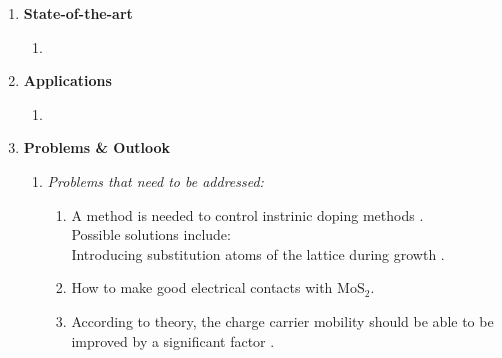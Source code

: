 \documentclass{article}
\begin{document}
\begin{enumerate}
	\item{\textbf{State-of-the-art}}
		\begin{enumerate} %
			\item{}
		\end{enumerate}	%

	\item{\textbf{Applications}}
		\begin{enumerate}
			\item{}
		\end{enumerate}

	\item{\textbf{Problems \& Outlook}}

		\begin{enumerate}	%
			\item{\textit{Problems that need to be addressed:}}
				\begin{enumerate}
					\item{A method is needed to control instrinic doping methods \cite{singleLayerMoS2electronics2015}. \\
					Possible solutions include:\\
					\indent Introducing substitution atoms of the lattice during growth \cite{Dolui2013}.}
					\item{How to make good electrical contacts with $\mathrm{MoS}_2$. \cite{singleLayerMoS2electronics2015}}
					\item{According to theory, the charge carrier mobility should be able to be improved by a significant factor \cite{singleLayerMoS2electronics2015, Kaasbjerg2013}.}
				\end{enumerate}
		\end{enumerate} %

\end{enumerate} %



\end{document}
